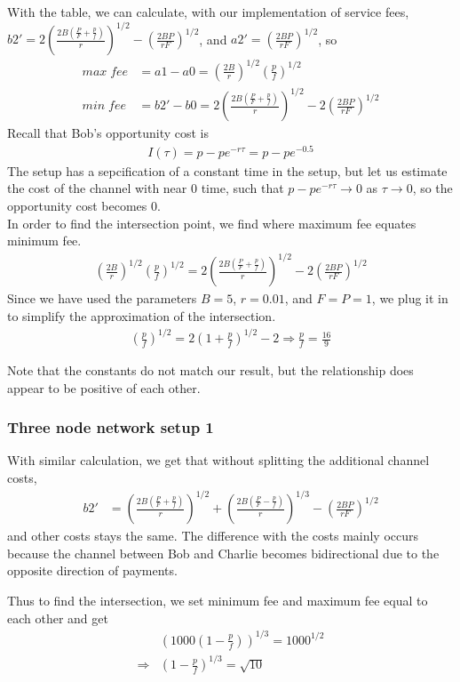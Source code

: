 \documentclass[twocolumn,10pt]{report}
\begin{document}
With the table, we can calculate, with our implementation of service fees, $b2'=2(\frac{2B(\frac{P}{F}+\frac{p}{f})}{r})^{1/2}-(\frac{2BP}{rF})^{1/2}$, and $a2'=(\frac{2BP}{rF})^{1/2}$, so
\begin{align}
    max\;fee &= a1-a0=(\frac{2B}{r})^{1/2}(\frac{p}{f})^{1/2}\\
    min\;fee &= b2'-b0=2(\frac{2B(\frac{P}{F}+\frac{p}{f})}{r})^{1/2}-2(\frac{2BP}{rF})^{1/2}
\end{align}
Recall that Bob's opportunity cost is
\begin{align}
    I(\tau)= p-pe^{-r\tau}=p-pe^{-0.5}
\end{align}
The setup has a sepcification of a constant time in the setup, but let us estimate the cost of the channel with near $0 $ time, such that $p-pe^{-r\tau}\rightarrow 0 $ as $\tau \rightarrow 0$, so the opportunity cost becomes 0. \\
In order to find the intersection point, we find where maximum fee equates minimum fee.
\begin{align}
    (\frac{2B}{r})^{1/2}(\frac{p}{f})^{1/2} =  2(\frac{2B(\frac{P}{F}+\frac{p}{f})}{r})^{1/2}-2(\frac{2BP}{rF})^{1/2}
\end{align}
Since we have used the parameters $B=5$, $r=0.01$, and $F=P=1$, we plug it in to simplify the approximation of the intersection.
\begin{align}
    (\frac{p}{f})^{1/2} =  2(1+\frac{p}{f})^{1/2}-2 \Rightarrow \frac{p}{f}=\frac{16}{9}
\end{align}

Note that the constants do not match our result, but the relationship does appear to be positive of each other. 

\subsubsection{Three node network setup 1}

With similar calculation, we get that without splitting the additional channel costs, 
\begin{align}
    b2'& = (\frac{2B(\frac{P}{F}+\frac{p}{f})}{r})^{1/2}+(\frac{2B(\frac{P}{F}-\frac{p}{f})}{r})^{1/3}-(\frac{2BP}{rF})^{1/2} 
\end{align}
and other costs stays the same. The difference with the costs mainly occurs because the channel between Bob and Charlie becomes bidirectional due to the opposite direction of payments. 

Thus to find the intersection, we set minimum fee and maximum fee equal to each other and get
\begin{align}
    &(1000(1-\frac{p}{f}))^{1/3}=1000^{1/2} \\
    \Rightarrow & (1-\frac{p}{f})^{1/3}=\sqrt{10}
\end{align}
\end{document}
